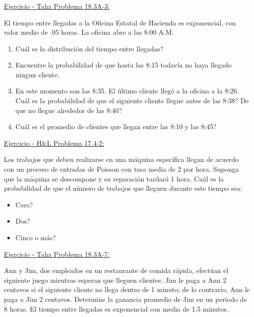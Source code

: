 \documentclass[ 10pt, xcolor = dvipsnames]{beamer}
\begin{document}
\begin{frame}[allowframebreaks]
\frametitle{\insertsection}

\underline{Ejercicio - Taha Problema 18.3A-3:}

El tiempo entre llegadas a la Oficina Estatal de Hacienda es exponencial, \linebreak con valor medio de .05 horas. La oficina abre a las 8:00 A.M. 
\begin{enumerate}
\item Cu\'al es la distribuci\'on del tiempo entre llegadas?
\item Encuentre la probabilidad de que hasta las 8:15 todav\'ia no haya llegado ningun cliente. 
\item En este momento son las 8:35. El \'ultimo cliente lleg\'o a la oficina a la 8:26. Cu\'al es la probabilidad de que el siguiente cliente llegue antes de las 8:38? De que no llegue alrededor de las 8:40?
\item Cu\'al es el promedio de clientes que llegan entre las 8:10 y las 8:45?
\end{enumerate}

\framebreak

\underline{Ejercicio - H\&L Problema 17.4-2:}

Los trabajos que deben realizarse en una m\'aquina espec\'ifica llegan de acuerdo con un proceso de entradas de Poisson con tasa media de 2 por hora. Suponga que la m\'aquina se descompone y su reparaci\'on tardar\'a 1 hora. Cu\'al es la probabilidad de que el n\'umero de trabajos que lleguen durante este tiempo sea: 
\begin{itemize}
\item Cero?
\item Dos?
\item Cinco o m\'as?
\end{itemize}

\framebreak

\underline{Ejercicio - Taha Problema 18.3A-7:}

Ann y Jim, dos empleados en un restaurante de comida r\'apida, efect\'uan el siguiente juego mientras esperan que lleguen clientes: Jim le paga a Ann 2 centavos si el siguiente cliente no llega dentro de 1 minuto; de lo contrario, \linebreak Ann le paga a Jim 2 centavos. Determine la ganancia promedio de Jim en un periodo de 8 horas. El tiempo entre llegadas es exponencial con media de 1.5 minutos. 


\end{frame}
\end{document}

